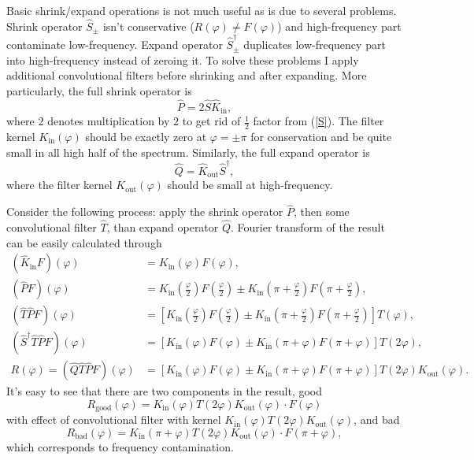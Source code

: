 \documentclass[10pt]{article}
\begin{document}
Basic shrink/expand operations is not much useful as is due to several problems. Shrink operator
$\hat S_\pm$ isn't conservative ($R(\varphi)\neq F(\varphi)$) and high-frequency part contaminate
low-frequency. Expand operator $\hat S^\dagger_\pm$ duplicates low-frequency part into
high-frequency instead of zeroing it. To solve these problems I apply additional convolutional
filters before shrinking and after expanding. More particularly, the full shrink operator is
\begin{equation}\label{P}
    \hat P = 2\hat S\hat K_{\text{in}},
\end{equation}
where $2$ denotes multiplication by $2$ to get rid of $\frac12$ factor from (\ref{S}). The filter
kernel $K_{\text{in}}(\varphi)$ should be exactly zero at $\varphi = \pm\pi$ for conservation and be
quite small in all high half of the spectrum. Similarly, the full expand operator is
\begin{equation}\label{Q}
    \hat Q = \hat K_{\text{out}}\hat S^\dagger,
\end{equation}
where the filter kernel $K_{\text{out}}(\varphi)$ should be small at high-frequency.

Consider the following process: apply the shrink operator $\hat P$, then some convolutional filter
$\hat T$, than expand operator $\hat Q$. Fourier transform of the result can be easily calculated
through
\begin{align}
    (\hat K_{\text{in}}F)(\varphi) &= K_{\text{in}}(\varphi)F(\varphi),\\
    (\hat PF)(\varphi) &=
        K_{\text{in}}\left(\frac\varphi2\right)F\left(\frac\varphi2\right) \pm
        K_{\text{in}}\left(\pi+\frac\varphi2\right)F\left(\pi+\frac\varphi2\right),\\
    (\hat T\hat PF)(\varphi) &= \left[
        K_{\text{in}}\left(\frac\varphi2\right)F\left(\frac\varphi2\right) \pm
        K_{\text{in}}\left(\pi+\frac\varphi2\right)F\left(\pi+\frac\varphi2\right)
        \right]T(\varphi),\\
    (\hat S^\dagger\hat T\hat PF)(\varphi) &= \left[K_{\text{in}}(\varphi)F(\varphi) \pm
        K_{\text{in}}(\pi+\varphi)F(\pi+\varphi)\right]T(2\varphi),\\
    R(\varphi) = (\hat Q\hat T\hat PF)(\varphi) &= \left[K_{\text{in}}(\varphi)F(\varphi) \pm
        K_{\text{in}}(\pi+\varphi)F(\pi+\varphi)\right]T(2\varphi)K_{\text{out}}(\varphi).
\end{align}
It's easy to see that there are two components in the result, good
\begin{equation}
    R_{\text{good}}(\varphi) =
        K_{\text{in}}(\varphi)T(2\varphi)K_{\text{out}}(\varphi)\cdot F(\varphi)
\end{equation}
with effect of convolutional filter with kernel
$K_{\text{in}}(\varphi)T(2\varphi)K_{\text{out}}(\varphi)$, and bad
\begin{equation}
    R_{\text{bad}}(\varphi) =
        K_{\text{in}}(\pi+\varphi)T(2\varphi)K_{\text{out}}(\varphi)\cdot F(\pi+\varphi),
\end{equation}
which corresponds to frequency contamination.
\end{document}
